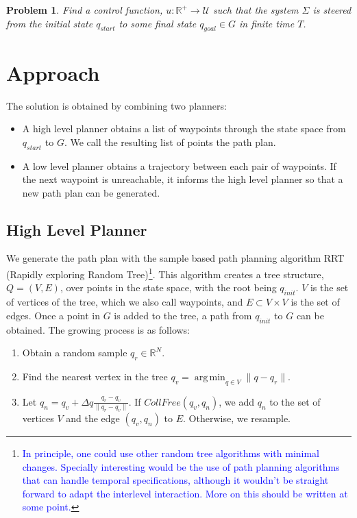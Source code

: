 \documentclass[12pt]{article}
\newtheorem{problem}{Problem}
\DeclareMathOperator*{\argmin}{arg\,min}
\newcommand\fran[1]{\textcolor{blue}{#1}}
\newcommand\ffran[1]{\textcolor{blue}{\footnote{\fran{#1}}}}
\begin{document}
\begin{problem}\label{pr:reach}
Find a control function, $u : \mathbb{R}^+ \rightarrow \mathcal{U}$ such that the system $\Sigma$ is steered from the initial state $q_{start}$ to some final state $q_{goal} \in G$ in finite time $T$.
\end{problem}

\section{Approach}
\label{sec:approach}

The solution is obtained by combining two planners: 

\begin{itemize}
    \item A high level planner obtains a list of waypoints through the state space from $q_{start}$ to $G$. We call the resulting list of points the path plan.
    \item A low level planner obtains a trajectory between each pair of waypoints. If the next waypoint is unreachable, it informs the high level planner so that a new path plan can be generated.
\end{itemize}

\subsection{High Level Planner}
\label{sub:high_level_planner}

We generate the path plan with the sample based path planning algorithm RRT (Rapidly exploring Random Tree)\ffran{In principle, one could use other random tree algorithms with minimal changes. Specially interesting would be the use of path planning algorithms that can handle temporal specifications, although it wouldn't be straight forward to adapt the interlevel interaction. More on this should be written at some point.}. This algorithm creates a tree structure, $Q = (V, E)$, over points in the state space, with the root being $q_{init}$. $V$ is the set of vertices of the tree, which we also call waypoints, and $E \subset V \times V$ is the set of edges. Once a point in $G$ is added to the tree, a path from $q_{init}$ to $G$ can be obtained. The growing process is as follows:

\begin{enumerate}
    \item Obtain a random sample $q_r \in \mathbb{R}^N$.
    \item Find the nearest vertex in the tree $q_v = \argmin_{q \in V} \|q - q_r\|$.
    \item Let $q_n = q_v + \Delta q \frac{q_r - q_v}{\|q_r - q_v\|}$. If $CollFree(q_v, q_n)$, we add $q_n$ to the set of vertices $V$ and the edge $(q_v, q_n)$ to $E$. Otherwise, we resample.
\end{enumerate}
\end{document}
